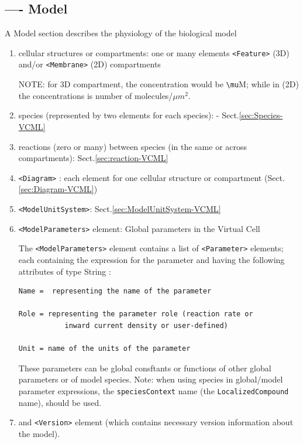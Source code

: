 \subsection{---- Model}
\label{sec:Model-VCML}

A Model section describes the physiology of the biological model 
\begin{enumerate}
  \item  cellular structures or compartments: one or many elements 
  \verb!<Feature>! (3D) and/or \verb!<Membrane>! (2D) compartments

NOTE: for 3D compartment, the concentration would be \verb!\mu!M; while in (2D)
the concentrations is number of molecules/$\mu m^2$.
  
  \item  species (represented by two elements for each species): -
  Sect.\ref{sec:Species-VCML} 
  
  \item reactions (zero or many) between species (in the same or across
  compartments):   Sect.\ref{sec:reaction-VCML}

  
  \item \verb!<Diagram>! : each element for one cellular structure or
  compartment (Sect.\ref{sec:Diagram-VCML})
  

  
  \item \verb!<ModelUnitSystem>!: Sect.\ref{sec:ModelUnitSystem-VCML} 
  
  \item \verb!<ModelParameters>! element: Global parameters in the Virtual Cell 
  
The \verb!<ModelParameters>! element contains a list of \verb!<Parameter>!
elements; each containing the expression for the parameter and having the
following attributes of type String : 
\begin{verbatim}
Name =  representing the name of the parameter

Role = representing the parameter role (reaction rate or 
           inward current density or user-defined)

Unit = name of the units of the parameter
\end{verbatim}

These parameters can be global consftants or functions
of other global parameters or of model species. Note: when using species in
global/model parameter expressions, the \verb!speciesContext! name (the
\verb!LocalizedCompound! name), should be used.
  
  \item and \verb!<Version>!  element (which contains necessary version information about the model). 
\end{enumerate}

